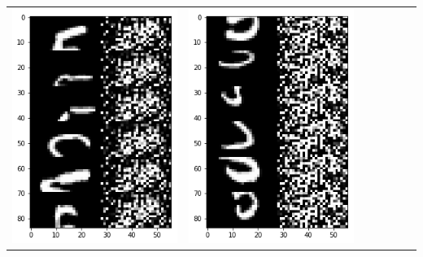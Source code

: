\documentclass[12pt]{report} %
\begin{document}
\begin{tabular}{m{0.7cm}m{2.4cm}m{2.4cm}m{2.4cm}m{2.4cm}m{2.4cm}m{2.4cm}}
\includegraphics[scale=0.3]{pictures/M2_5_up.png} & \includegraphics[scale=0.3]{pictures/M2_5_down.png}\\

\end{tabular}
\end{document}
